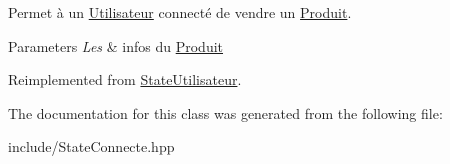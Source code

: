 Permet à un \hyperlink{classUtilisateur}{Utilisateur} connecté de vendre un \hyperlink{classProduit}{Produit}. 


\begin{DoxyParams}{Parameters}
{\em Les} & infos du \hyperlink{classProduit}{Produit} \\
\hline
\end{DoxyParams}


Reimplemented from \hyperlink{classStateUtilisateur_aa039ece92cb1663b9badf6ce4926fe1c}{State\-Utilisateur}.



The documentation for this class was generated from the following file\-:\begin{DoxyCompactItemize}
\item 
include/State\-Connecte.\-hpp\end{DoxyCompactItemize}
